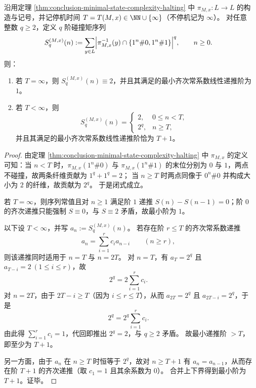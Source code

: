 \begin{theorem}[二值纤维阈值序贯转导的碰撞矩序列与最小递推阶]\label{thm:conclusion-collision-moment-minrec-halting-time}
沿用定理 \ref{thm:conclusion-minimal-state-complexity-halting} 中 \(\pi_{M,x}:L\to L\) 的构造与记号，并记停机时间 \(T=T(M,x)\in\NN\cup\{\infty\}\)（不停机记为 \(\infty\)）。
对任意整数 \(q\ge 2\)，定义 \(q\) 阶碰撞矩序列
\[
S_q^{(M,x)}(n)
:=\sum_{y\in L}\Bigl|\pi_{M,x}^{-1}(y)\cap\{1^n\#0,1^n\#1\}\Bigr|^q,
\qquad n\ge 0.
\]
则：
\begin{enumerate}
  \item 若 \(T=\infty\)，则 \(S_q^{(M,x)}(n)\equiv 2\)，并且其满足的最小齐次常系数线性递推阶为 \(1\)。
  \item 若 \(T<\infty\)，则
  \[
  S_q^{(M,x)}(n)=
  \begin{cases}
  2,& 0\le n<T,\\
  2^q,& n\ge T,
  \end{cases}
  \]
  并且其满足的最小齐次常系数线性递推阶恰为 \(T+1\)。
\end{enumerate}
\end{theorem}
\begin{proof}
由定理 \ref{thm:conclusion-minimal-state-complexity-halting} 中 \(\pi_{M,x}\) 的定义可知：当 \(n<T\) 时，\(\pi_{M,x}(1^n\#0)\) 与 \(\pi_{M,x}(1^n\#1)\) 的末位分别为 \(0\) 与 \(1\)，两点不碰撞，故两条纤维贡献为 \(1^q+1^q=2\)；
当 \(n\ge T\) 时两点同像于 \(0^n\#0\) 并构成大小为 \(2\) 的纤维，故贡献为 \(2^q\)。
于是闭式成立。

若 \(T=\infty\)，则序列常值且对 \(n\ge 1\) 满足阶 \(1\) 递推 \(S(n)-S(n-1)=0\)；阶 \(0\) 的齐次递推只能强制 \(S\equiv 0\)，与 \(S\equiv 2\) 矛盾，故最小阶为 \(1\)。

以下设 \(T<\infty\)，并写 \(a_n:=S_q^{(M,x)}(n)\)。
若存在阶 \(r\le T\) 的齐次常系数递推
\[
a_n=\sum_{i=1}^{r}c_i a_{n-i}\qquad(n\ge r),
\]
则该递推同时适用于 \(n=T\) 与 \(n=2T\)。
对 \(n=T\)，有 \(a_T=2^q\) 且 \(a_{T-i}=2\ (1\le i\le r)\)，故
\[
2^q=2\sum_{i=1}^{r}c_i.
\]
对 \(n=2T\)，由于 \(2T-i\ge T\)（因为 \(i\le r\le T\)），从而 \(a_{2T}=2^q\) 且 \(a_{2T-i}=2^q\)，于是
\[
2^q=2^q\sum_{i=1}^{r}c_i.
\]
由此得 \(\sum_{i=1}^{r}c_i=1\)，代回即推出 \(2^q=2\)，与 \(q\ge 2\) 矛盾。
故最小递推阶 \(>T\)，即至少为 \(T+1\)。

另一方面，由于 \(a_n\) 在 \(n\ge T\) 时恒等于 \(2^q\)，故对 \(n\ge T+1\) 有 \(a_n=a_{n-1}\)，从而存在阶 \(T+1\) 的齐次递推（取 \(c_1=1\) 且其余系数为 \(0\)）。
合并上下界得到最小阶为 \(T+1\)。证毕。
\end{proof}

